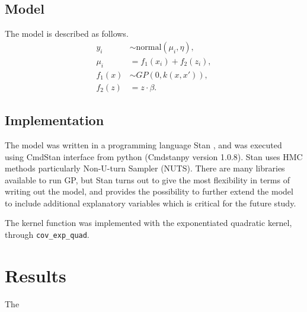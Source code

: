 \documentclass{article}
\begin{document}



\subsection*{Model}
The model is described as follows. 
\begin{align*}
    y_i &\sim \text{normal}(\mu_i, \eta),\\
    \mu_i &= f_1(x_i) + f_2(z_i),\\
    f_1(x) &\sim GP(0,k(x,x')),\\
    f_2(z) &= z\cdot \beta.
\end{align*}


\subsection*{Implementation}
The model was written in a programming language Stan \cite{carpenter2017stan,riutort2020practical}, and was executed using CmdStan interface from python (Cmdstanpy version 1.0.8). Stan uses HMC methods particularly Non-U-turn Sampler (NUTS). There are many libraries available to run GP, but Stan turns out to give the most flexibility in terms of writing out the model, and provides the possibility to further extend the model to include additional explanatory variables which is critical for the future study. 

The kernel function was implemented with the exponentiated quadratic kernel, through \texttt{cov\_exp\_quad}.



\section{Results}
The 
\end{document}
